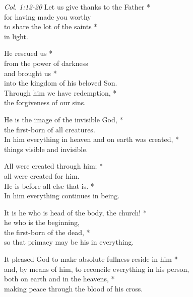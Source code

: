     \emph{Col. 1:12-20}
%
Let us give thanks to the Father *\\
for having made you worthy\\
to share the lot of the saints *\\
in light.

He rescued us *\\
from the power of darkness\\
and brought us *\\
into the kingdom of his beloved Son.\\
Through him we have redemption, *\\
the forgiveness of our sins.

He is the image of the invisible God, *\\
the first-born of all creatures.\\
In him everything in heaven and on earth was created, *\\
things visible and invisible.

All were created through him; *\\
all were created for him.\\
He is before all else that is. *\\
In him everything continues in being.

It is he who is head of the body, the church! *\\
he who is the beginning,\\
the first-born of the dead, *\\
so that primacy may be his in everything.

It pleased God to make absolute fullness reside in him *\\
and, by means of him, to reconcile everything in his person,\\
both on earth and in the heavens, *\\
making peace through the blood of his cross.